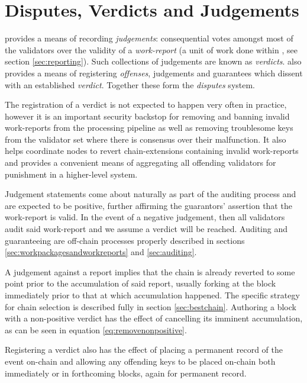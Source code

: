 \section{Disputes, Verdicts and Judgements}\label{sec:disputes}

\newcommand*{\verdicts}{\mathbf{V}}
\newcommand*{\xtverdicts}{\mathbf{v}}
\newcommand*{\xtculprits}{\mathbf{c}}
\newcommand*{\xtfaults}{\mathbf{f}}

\Jam provides a means of recording \emph{judgements}: consequential votes amongst most of the validators over the validity of a \emph{work-report} (a unit of work done within \Jam, see section \ref{sec:reporting}). Such collections of judgements are known as \emph{verdicts}. \Jam also provides a means of registering \emph{offenses}, judgements and guarantees which dissent with an established \emph{verdict}. Together these form the \emph{disputes} system.

The registration of a verdict is not expected to happen very often in practice, however it is an important security backstop for removing and banning invalid work-reports from the processing pipeline as well as removing troublesome keys from the validator set where there is consensus over their malfunction. It also helps coordinate nodes to revert chain-extensions containing invalid work-reports and provides a convenient means of aggregating all offending validators for punishment in a higher-level system.

Judgement statements come about naturally as part of the auditing process and are expected to be positive, further affirming the guarantors' assertion that the work-report is valid. In the event of a negative judgement, then all validators audit said work-report and we assume a verdict will be reached. Auditing and guaranteeing are off-chain processes properly described in sections \ref{sec:workpackagesandworkreports} and \ref{sec:auditing}.

A judgement against a report implies that the chain is already reverted to some point prior to the accumulation of said report, usually forking at the block immediately prior to that at which accumulation happened. The specific strategy for chain selection is described fully in section \ref{sec:bestchain}. Authoring a block with a non-positive verdict has the effect of cancelling its imminent accumulation, as can be seen in equation \ref{eq:removenonpositive}.

Registering a verdict also has the effect of placing a permanent record of the event on-chain and allowing any offending keys to be placed on-chain both immediately or in forthcoming blocks, again for permanent record.

